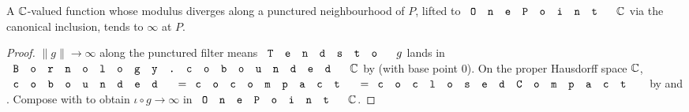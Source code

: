 \begin{lemma}
\label{lem:onepoint-tendsto-infty-of-modulus-diverges}
A \(\mathbb{C}\)-valued function whose modulus diverges along a punctured
neighbourhood of \(P\), lifted to \(\code{OnePoint}\,\C\) via the
canonical inclusion, tends to \(\infty\) at \(P\).
\leanok
\end{lemma}
\begin{proof}\leanok
\(\|g\|\to\infty\) along the punctured filter means
\(\code{Tendsto}\,g\) lands in \(\code{Bornology.cobounded}\,\C\) by
 (with base point
\(0\)). On the proper Hausdorff space \(\mathbb{C}\),
\(\code{cobounded}=\code{cocompact}=\code{coclosedCompact}\) by
 and
. Compose with
 to obtain
\(\iota\circ g\to\infty\) in \(\code{OnePoint}\,\C\).
\end{proof}



